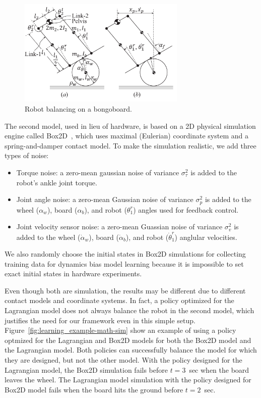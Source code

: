 \begin{figure}[tb]
\begin{center}
\includegraphics[width=80mm]{eps/dynamicModelNOutputs.pdf}
\caption{Robot balancing on a bongoboard.}
\label{fig:learning_bongoboard}
\end{center}
\end{figure}


The second model, used in lieu of hardware, is based on a 2D physical
simulation engine called 
Box2D~\cite{bib-box2d}, which uses maximal (Eulerian) coordinate system and
a spring-and-damper contact model. %
To make the simulation realistic, we add three types of noise:
\begin{itemize}
\item Torque noise: a zero-mean gaussian noise of variance
	  $\sigma_{\tau}^2$ is added to the robot's ankle joint torque.
\item Joint angle noise: a zero-mean Gaussian noise of variance
	  $\sigma_{p}^2$ is added to the wheel ($\alpha_w$), board
	  ($\alpha_b$), and robot ($\theta_1^r$) angles used for feedback
	  control. 
\item Joint velocity sensor noise: a zero-mean Guassian noise of
	  variance $\sigma_v^2$ is added to the wheel ($\dot{\alpha}_w$),
	  board ($\dot{\alpha}_b$), and robot ($\dot{\theta}_1^r$)
	  anglular velocities.
\end{itemize}
We also randomly choose the initial states in Box2D simulations for
collecting training data for dynamics bias model learning because it is
impossible to set exact initial states in hardware experiments.

Even though both are simulation, the results may be different due to
different contact models and coordinate systems.
In fact, a policy optimized for the Lagrangian model does not always balance
the robot in the second model, which justifies the need for our
framework even in this simple setup.
Figure~\ref{fig:learning_example-math-sim} show an example of using a policy
optmized for the Lagrangian and Box2D models for both the Box2D model
and the Lagrangian model.
Both policies can successfully balance the model for which they are
designed, but not the other model.
With the policy designed for the Lagrangian model, the Box2D simulation
fails before $t=3$~sec when the board leaves the wheel.
The Lagrangian model simulation with the policy designed for Box2D model
fails when the board hits the ground before $t=2$~sec.

